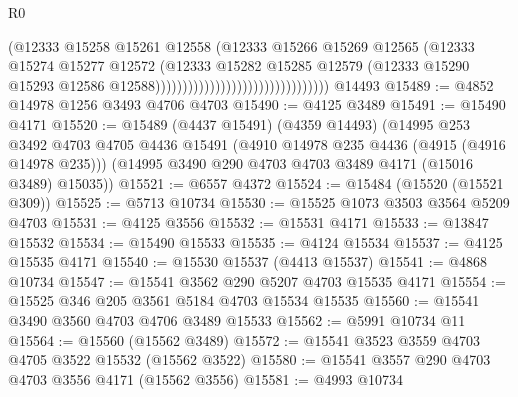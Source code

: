 \begin{lexlean}{R0}
\begin{coremodule}
                                                          (@12333
                                                            @15258
                                                            @15261
                                                            @12558
                                                            (@12333
                                                              @15266
                                                              @15269
                                                              @12565
                                                              (@12333
                                                                @15274
                                                                @15277
                                                                @12572
                                                                (@12333
                                                                  @15282
                                                                  @15285
                                                                  @12579
                                                                  (@12333
                                                                    @15290
                                                                    @15293
                                                                    @12586
                                                                    @12588))))))))))))))))))))))))))))))))
    @14493
@15489 := @4852 @14978 @1256 @3493 @4706 @4703
@15490 := @4125 @3489
@15491 := @15490 @4171
@15520 := @15489
    (@4437 @15491)
    (@4359 @14493)
    (@14995
      @253
      @3492
      @4703
      @4705
      @4436
      @15491
      (@4910 @14978 @235 @4436 (@4915 (@4916 @14978 @235)))
      (@14995 @3490 @290 @4703 @4703 @3489 @4171 (@15016 @3489) @15035))
@15521 := @6557 @4372
@15524 := @15484 (@15520 (@15521 @309))
@15525 := @5713 @10734
@15530 := @15525 @1073 @3503 @3564 @5209 @4703
@15531 := @4125 @3556
@15532 := @15531 @4171
@15533 := @13847 @15532
@15534 := @15490 @15533
@15535 := @4124 @15534
@15537 := @4125 @15535 @4171
@15540 := @15530 @15537 (@4413 @15537)
@15541 := @4868 @10734
@15547 := @15541 @3562 @290 @5207 @4703 @15535 @4171
@15554 := @15525 @346 @205 @3561 @5184 @4703 @15534 @15535
@15560 := @15541 @3490 @3560 @4703 @4706 @3489 @15533
@15562 := @5991 @10734 @11
@15564 := @15560 (@15562 @3489)
@15572 := @15541 @3523 @3559 @4703 @4705 @3522 @15532 (@15562 @3522)
@15580 := @15541 @3557 @290 @4703 @4703 @3556 @4171 (@15562 @3556)
@15581 := @4993 @10734

\end{coremodule}
\end{lexlean}
